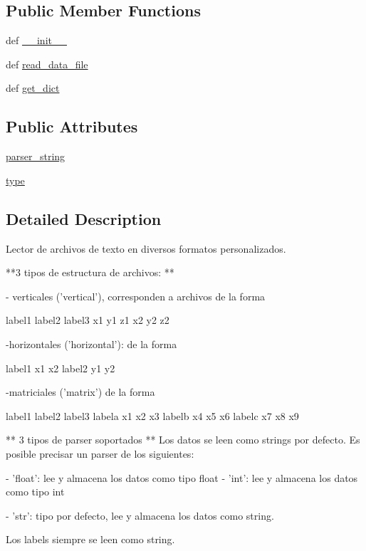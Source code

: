 \subsection*{Public Member Functions}
\begin{DoxyCompactItemize}
\item 
def \hyperlink{classcustom__file__reader_1_1_custom_file_reader_ae30508851658f07eb975c973678c53a2}{\-\_\-\-\_\-init\-\_\-\-\_\-}
\item 
def \hyperlink{classcustom__file__reader_1_1_custom_file_reader_aa11c4ebcaffc5dd67222fcaccb5e4dab}{read\-\_\-data\-\_\-file}
\item 
def \hyperlink{classcustom__file__reader_1_1_custom_file_reader_a94927010da6c9358cd11cc79e37aa796}{get\-\_\-dict}
\end{DoxyCompactItemize}
\subsection*{Public Attributes}
\begin{DoxyCompactItemize}
\item 
\hyperlink{classcustom__file__reader_1_1_custom_file_reader_a219137e4cd4de13f1159979b3f8e95ea}{parser\-\_\-string}
\item 
\hyperlink{classcustom__file__reader_1_1_custom_file_reader_ab65f0b169e3a73961db6b0501ffb02d0}{type}
\end{DoxyCompactItemize}


\subsection{Detailed Description}
\begin{DoxyVerb}Lector de archivos de texto en diversos formatos personalizados. 

**3 tipos de estructura de archivos: **

- verticales ('vertical'), corresponden a archivos de la forma

label1  label2  label3
x1  y1  z1
x2  y2  z2

-horizontales ('horizontal'): de la forma

label1  x1  x2
label2  y1  y2

-matriciales ('matrix') de la forma

    label1  label2  label3
labela  x1  x2  x3
labelb  x4  x5  x6
labelc  x7  x8  x9

** 3 tipos de parser soportados **
Los datos se leen como strings por defecto. Es posible precisar un parser de los siguientes:

- 'float': lee y almacena los datos como tipo float
- 'int': lee y almacena los datos como tipo int

- 'str': tipo por defecto, lee y almacena los datos como string.

Los labels siempre se leen como string.\end{DoxyVerb}
 

